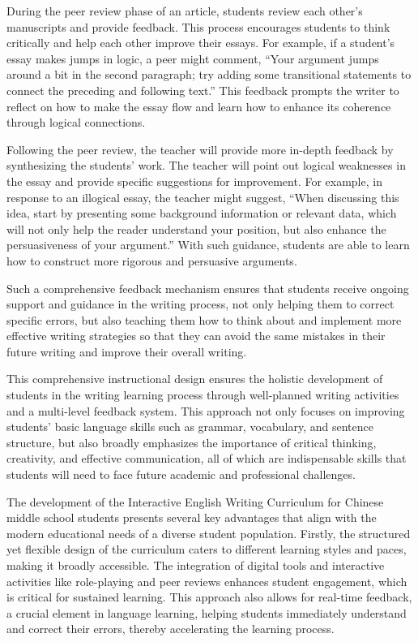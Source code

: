 \documentclass[11pt]{article}
\begin{document}
During the peer review phase of an article, students review each other's manuscripts and provide feedback. This process encourages students to think critically and help each other improve their essays. For example, if a student's essay makes jumps in logic, a peer might comment, ``Your argument jumps around a bit in the second paragraph; try adding some transitional statements to connect the preceding and following text.'' This feedback prompts the writer to reflect on how to make the essay flow and learn how to enhance its coherence through logical connections.

Following the peer review, the teacher will provide more in-depth feedback by synthesizing the students' work. The teacher will point out logical weaknesses in the essay and provide specific suggestions for improvement. For example, in response to an illogical essay, the teacher might suggest, ``When discussing this idea, start by presenting some background information or relevant data, which will not only help the reader understand your position, but also enhance the persuasiveness of your argument.'' With such guidance, students are able to learn how to construct more rigorous and persuasive arguments.

Such a comprehensive feedback mechanism ensures that students receive ongoing support and guidance in the writing process, not only helping them to correct specific errors, but also teaching them how to think about and implement more effective writing strategies so that they can avoid the same mistakes in their future writing and improve their overall writing.

This comprehensive instructional design ensures the holistic development of students in the writing learning process through well-planned writing activities and a multi-level feedback system. This approach not only focuses on improving students' basic language skills such as grammar, vocabulary, and sentence structure, but also broadly emphasizes the importance of critical thinking, creativity, and effective communication, all of which are indispensable skills that students will need to face future academic and professional challenges.

The development of the Interactive English Writing Curriculum for Chinese middle school students presents several key advantages that align with the modern educational needs of a diverse student population. Firstly, the structured yet flexible design of the curriculum caters to different learning styles and paces, making it broadly accessible. The integration of digital tools and interactive activities like role-playing and peer reviews enhances student engagement, which is critical for sustained learning. This approach also allows for real-time feedback, a crucial element in language learning, helping students immediately understand and correct their errors, thereby accelerating the learning process.
\end{document}
